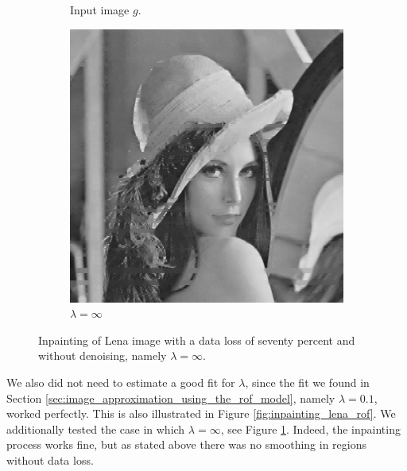 \documentclass[abstracton]{scrreprt}
\begin{document}
\begin{figure}[!ht]
\begin{subfigure}[b]{0.30\textwidth}
                \caption{Input image $g$.}
            \end{subfigure}
            \begin{subfigure}[b]{0.30\textwidth}
                \includegraphics[width=\textwidth]{img/inpainting/pwclena.png}
                \caption{$\lambda = \infty$}
            \end{subfigure}
            \caption[Inpainting with seventy percent data loss without denoising.]{Inpainting of Lena image with a data loss of seventy percent and without denoising, namely $\lambda = \infty$.}
        \label{fig:inpainting_lena_rof_pwc}
        \end{figure}
        We also did not need to estimate a good fit for $\lambda$, since the fit we found in Section \ref{sec:image_approximation_using_the_rof_model}, namely $\lambda = 0.1$, worked perfectly. This is also illustrated in Figure \ref{fig:inpainting_lena_rof}. We additionally tested the case in which $\lambda = \infty$, see Figure \ref{fig:inpainting_lena_rof_pwc}. Indeed, the inpainting process works fine, but as stated above there was no smoothing in regions without data loss.\\
\end{document}
